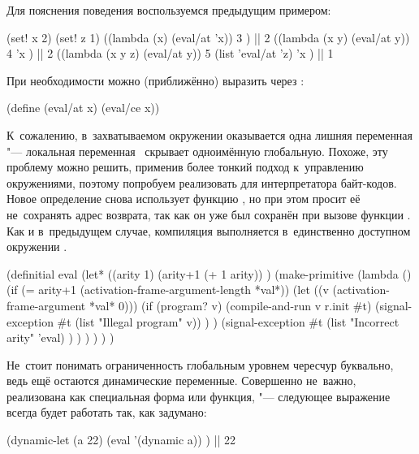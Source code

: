 Для пояснения поведения  воспользуемся предыдущим примером:

\begin{code:lisp}
(set! x 2) (set! z 1)
((lambda (x) (eval/at 'x))
 3 )                          |\is| 2
((lambda (x y) (eval/at y))
 4 'x )                       |\is| 2
((lambda (x y z) (eval/at y))
 5 (list 'eval/at 'z) 'x )    |\is| 1
\end{code:lisp}

\noindent
При необходимости можно (приближённо) выразить  через :

\begin{code:lisp}
(define (eval/at x) (eval/ce x))
\end{code:lisp}

\noindent
К~сожалению, в~захватываемом  окружении оказывается одна лишняя
переменная "--- локальная переменная~ скрывает одноимённую глобальную.
 Похоже, эту проблему можно решить, применив
более тонкий подход к~управлению окружениями, поэтому попробуем реализовать
 для интерпретатора байт-кодов. Новое определение снова использует
функцию , но при этом просит её не~сохранять адрес возврата,
так как он уже был сохранён при вызове функции . Как и в~предыдущем
случае, компиляция выполняется в~единственно доступном окружении .

\begin{code:lisp}
(definitial eval
  (let* ((arity 1)
         (arity+1 (+ 1 arity)) )
    (make-primitive
      (lambda ()
        (if (= arity+1 (activation-frame-argument-length *val*))
            (let ((v (activation-frame-argument *val* 0)))
              (if (program? v)
                  (compile-and-run v r.init #t)
                  (signal-exception #t (list "Illegal program" v)) ) )
            (signal-exception #t
              (list "Incorrect arity" 'eval) ) ) ) ) ) )
\end{code:lisp}

Не~стоит понимать ограниченность  глобальным уровнем чересчур
буквально, ведь ещё остаются динамические переменные. Совершенно не~важно,
реализована  как специальная форма или функция, "--- следующее
выражение всегда будет работать так, как задумано:

\begin{code:lisp}
(dynamic-let (a 22)
  (eval '(dynamic a)) ) |\is| 22
\end{code:lisp}

